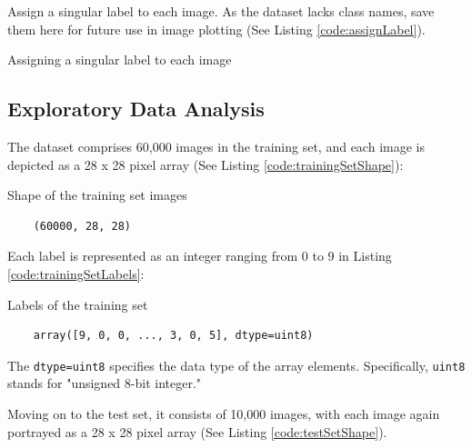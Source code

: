 Assign a singular label to each image. As the dataset lacks class names, save them here for future use in image plotting (See Listing \ref{code:assignLabel}).

\begin{code}[h!]
	    
	
	\caption{Assigning a singular label to each image}
	\label{code:assignLabel}
\end{code}

\subsection{Exploratory Data Analysis}

The dataset comprises 60,000 images in the training set, and each image is depicted as a 28 x 28 pixel array (See Listing \ref{code:trainingSetShape}):

\begin{code}[h!]
	    
	
	\caption{Shape of the training set images}
	\label{code:trainingSetShape}
\end{code}

\begin{verbatim}
	(60000, 28, 28)
\end{verbatim}

Each label is represented as an integer ranging from 0 to 9 in Listing \ref{code:trainingSetLabels}:

\begin{code}[h!]
	    
	
	\caption{Labels of the training set}
	\label{code:trainingSetLabels}
\end{code}

\begin{verbatim}
	array([9, 0, 0, ..., 3, 0, 5], dtype=uint8)
\end{verbatim}

The \texttt{dtype=uint8} specifies the data type of the array elements. Specifically, \texttt{uint8} stands for "unsigned 8-bit integer."

Moving on to the test set, it consists of 10,000 images, with each image again portrayed as a 28 x 28 pixel array (See Listing \ref{code:testSetShape}).

